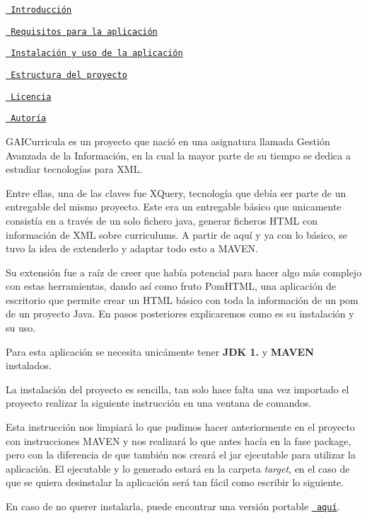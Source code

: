 
\begin{DoxyEnumerate}
\item \href{\#1-introducción}{\texttt{ Introducción}}
\item \href{\#2-requisitos-para-la-aplicación}{\texttt{ Requisitos para la aplicación}}
\item \href{\#3-instalación-y-uso-de-la-aplicación}{\texttt{ Instalación y uso de la aplicación}}
\item \href{\#4-estructura-del-proyecto}{\texttt{ Estructura del proyecto}}
\item \href{\#5-licencia}{\texttt{ Licencia}}
\item \href{\#6-autoría}{\texttt{ Autoría}}
\end{DoxyEnumerate}

G\+A\+I\+Curricula es un proyecto que nació en una asignatura llamada Gestión Avanzada de la Información, en la cual la mayor parte de su tiempo se dedica a estudiar tecnologías para X\+ML.

Entre ellas, una de las claves fue X\+Query, tecnología que debía ser parte de un entregable del mismo proyecto. Este era un entregable básico que unicamente consistía en a través de un solo fichero java, generar ficheros H\+T\+ML con información de X\+ML sobre curriculums. A partir de aquí y ya con lo básico, se tuvo la idea de extenderlo y adaptar todo esto a M\+A\+V\+EN.

Su extensión fue a raíz de creer que había potencial para hacer algo más complejo con estas herramientas, dando así como fruto Pom\+H\+T\+ML, una aplicación de escritorio que permite crear un H\+T\+ML básico con toda la información de un pom de un proyecto Java. En pasos posteriores explicaremos como es su instalación y su uso.

Para esta aplicación se necesita unicámente tener {\bfseries{J\+DK 1.}} y {\bfseries{M\+A\+V\+EN}} instalados.

La instalación del proyecto es sencilla, tan solo hace falta una vez importado el proyecto realizar la siguiente instrucción en una ventana de comandos. 
\begin{DoxyCode}{0}
\end{DoxyCode}
 Esta instrucción nos limpiará lo que pudimos hacer anteriormente en el proyecto con instrucciones M\+A\+V\+EN y nos realizará lo que antes hacía en la fase package, pero con la diferencia de que también nos creará el jar ejecutable para utilizar la aplicación. El ejecutable y lo generado estará en la carpeta {\itshape target}, en el caso de que se quiera desinstalar la aplicación será tan fácil como escribir lo siguiente. 
\begin{DoxyCode}{0}
\end{DoxyCode}
 En caso de no querer instalarla, puede encontrar una versión portable \href{https://github.com/cs-ehu/GAICurricula/releases/tag/1.0.1}{\texttt{ aquí}}. 

